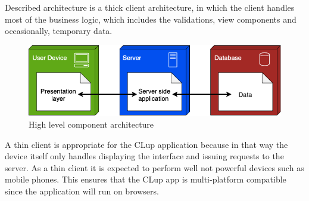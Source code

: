 Described architecture is a thick client architecture, in which the client handles most of the business logic, which includes the validations, view components and occasionally, temporary data.
\begin{figure}[H]
    \centering
    \includegraphics[height=0.2\textwidth]{Images/Overview.png}
    \caption{High level component architecture}
\end{figure}

A thin client is appropriate for the CLup application because in that way the device itself only handles displaying the interface and issuing requests to the server.
As a thin client it is expected to perform well not powerful devices such as mobile phones.
This ensures that the CLup app is multi-platform compatible since the application will run on browsers.


